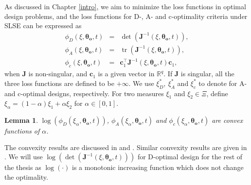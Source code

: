 \documentclass[
]{book}
\newtheorem{lemma}{Lemma}[chapter]
\theoremstyle{definition}
\theoremstyle{definition}
\theoremstyle{definition}
\theoremstyle{definition}
\theoremstyle{remark}
\begin{document}
As discussed in Chapter \ref{intro}, we aim to minimize the loss functions in optimal design problems, and the loss functions for D-, A- and c-optimality criteria under SLSE can be expressed as
\begin{equation}
\begin{aligned}
  \phi_D(\xi,\boldsymbol{\theta_o},t)&=&\det(\boldsymbol{J}^{-1}(\xi,\boldsymbol{\theta_o},t)),\\
  \phi_A(\xi,\boldsymbol{\theta_o},t)&=&\operatorname{tr}(\boldsymbol{J}^{-1}(\xi,\boldsymbol{\theta_o},t)),\\
  \phi_c(\xi,\boldsymbol{\theta_o},t)&=&\boldsymbol{c}_1^\top\boldsymbol{J}^{-1}(\xi,\boldsymbol{\theta_o},t)\boldsymbol{c}_1,
\end{aligned}
\label{eq:loss-J}
\end{equation}
when \(\boldsymbol{J}\) is non-singular, and \(\boldsymbol{c}_1\) is a given vector in \(\mathbb{R}^q\). If \(\boldsymbol{J}\) is singular, all the three loss functions are defined to be \(+\infty\). We use \(\xi_D^*,~\xi_A^*\) and \(\xi_c^*\) to denote for  A- and c-optimal designs, respectively. For two measures \(\xi_1\) and \(\xi_2\in \Xi\), define \(\xi_{\alpha}=(1-\alpha)\xi_1+\alpha \xi_2\) for \(\alpha \in[0,1]\).

\begin{lemma}
\(\log(\phi_D(\xi_{\alpha},\boldsymbol{\theta_o},t))\), \(\phi_A(\xi_{\alpha},\boldsymbol{\theta_o},t)\) and \(\phi_c(\xi_{\alpha},\boldsymbol{\theta_o},t)\) are convex functions of \(\alpha\).
\end{lemma}

The convexity results are discussed in \citet{boyd2004convex} and \citet{wong2019cvx}. Similar convexity results are given in \citet{bose2015optimal}. We will use \(\log(\det(\boldsymbol{J}^{-1}(\xi,\boldsymbol{\theta_o},t)))\) for D-optimal design for the rest of the thesis as \(\log(\cdot)\) is a monotonic increasing function which does not change the optimality.
\end{document}
